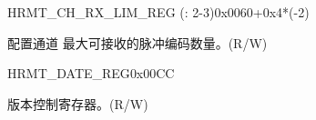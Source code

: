 \begin{register}{H}{RMT\_CH\_RX\_LIM\_REG (: 2-3)}{0x0060+0x4*(-2)}\label{regdesc:RMTCHMRXLIMREG}
%
%
\regnewline%
\begin{regdesc}\begin{reglist}
\label{fielddesc:RMTRXLIMCHM}\item [RMT\_RX\_LIM\_CH\regindex{m}] 配置通道  最大可接收的脉冲编码数量。(R/W)
\end{reglist}\end{regdesc}
\end{register}


\begin{register}{H}{RMT\_DATE\_REG}{0x00CC}\label{regdesc:RMTDATEREG}
%
%
\regnewline%
\begin{regdesc}\begin{reglist}
\label{fielddesc:RMTDATE}\item [RMT\_DATE] 版本控制寄存器。(R/W)
\end{reglist}\end{regdesc}
\end{register}
